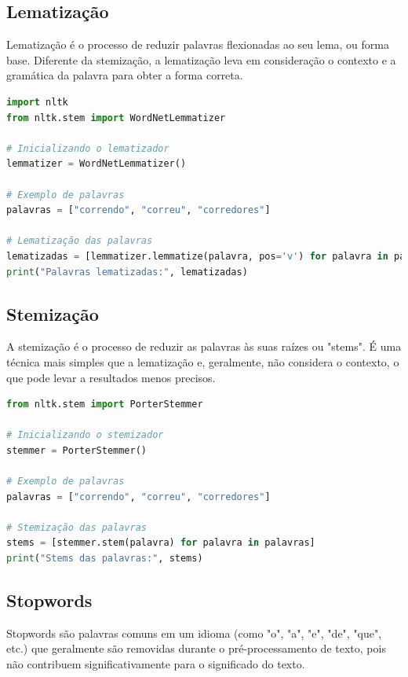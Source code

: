 \documentclass[14pt,a4paper,oneside]{book}
\begin{document}
\subsection{Lematização}

Lematização é o processo de reduzir palavras flexionadas ao seu lema, ou forma base. Diferente da stemização, a lematização leva em consideração o contexto e a gramática da palavra para obter a forma correta.

\begin{lstlisting}[language=Python]
import nltk
from nltk.stem import WordNetLemmatizer

# Inicializando o lematizador
lemmatizer = WordNetLemmatizer()

# Exemplo de palavras
palavras = ["correndo", "correu", "corredores"]

# Lematização das palavras
lematizadas = [lemmatizer.lemmatize(palavra, pos='v') for palavra in palavras]
print("Palavras lematizadas:", lematizadas)
\end{lstlisting}

\subsection{Stemização}

A stemização é o processo de reduzir as palavras às suas raízes ou "stems". É uma técnica mais simples que a lematização e, geralmente, não considera o contexto, o que pode levar a resultados menos precisos.

\begin{lstlisting}[language=Python]
from nltk.stem import PorterStemmer

# Inicializando o stemizador
stemmer = PorterStemmer()

# Exemplo de palavras
palavras = ["correndo", "correu", "corredores"]

# Stemização das palavras
stems = [stemmer.stem(palavra) for palavra in palavras]
print("Stems das palavras:", stems)
\end{lstlisting}

\subsection{Stopwords}

Stopwords são palavras comuns em um idioma (como "o", "a", "e", "de", "que", etc.) que geralmente são removidas durante o pré-processamento de texto, pois não contribuem significativamente para o significado do texto.
\end{document}
